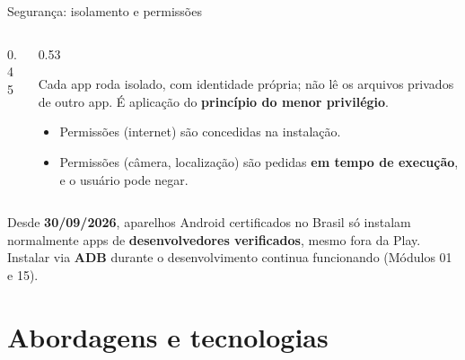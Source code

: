 \documentclass[aspectratio=169,10pt]{beamer}
\begin{document}
\begin{frame}{Segurança: isolamento e permissões}
  \begin{columns}[c]
    \begin{column}{0.45\textwidth}
      \centering
    \end{column}
    \begin{column}{0.53\textwidth}
      \begin{definicao}
        Cada app roda isolado, com identidade própria; não lê os arquivos privados de outro app. É aplicação do \textbf{princípio do menor privilégio}.
      \end{definicao}
      \small
      \begin{itemize}
        \item Permissões  (internet) são concedidas na instalação.
        \item Permissões  (câmera, localização) são pedidas \textbf{em tempo de execução}, e o usuário pode negar.
      \end{itemize}
    \end{column}
  \end{columns}
  \begin{atencao}
    Desde \textbf{30/09/2026}, aparelhos Android certificados no Brasil só instalam normalmente apps de \textbf{desenvolvedores verificados}, mesmo fora da Play. Instalar via \textbf{ADB} durante o desenvolvimento continua funcionando (Módulos 01 e 15).
  \end{atencao}
\end{frame}

\section{Abordagens e tecnologias}
\end{document}
